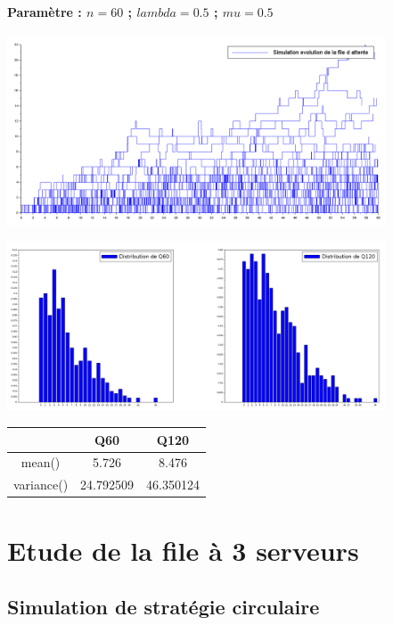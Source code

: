 \documentclass{article}
\begin{document}
\paragraph{Paramètre : $n=60$ ; $lambda=0.5$ ; $mu=0.5$}
\begin{center}
	\includegraphics[width=425px]{img/egal.PNG}
\end{center}
\begin{center}
	\includegraphics[width=425px]{img/egal/dist.png}
\end{center}
\begin{center}
	\begin{tabular}{c||c||c}
		& Q60 & Q120 \\
		\hline \hline
		mean() & 5.726 & 8.476 \\
		\hline \hline
		variance() & 24.792509 & 46.350124 \\
	\end{tabular}
\end{center}


\section{Etude de la file à 3 serveurs}

\subsection{Simulation de stratégie circulaire}
\end{document}
